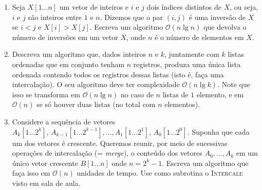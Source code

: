 \documentclass{article}
\begin{document}
\begin{enumerate}[itemsep=3ex, label=\textbf{\arabic*}.]
    \item
    Seja $X[1 \dots n]$ um vetor de inteiros e $i$ e $j$ dois índices distintos de $X$, ou seja,
    $i$ e $j$ são inteiros entre $1$ e $n$. Dizemos que o par $(i, j)$ é uma inversão de $X$
    se $i < j$ e $X[i] > X[j]$. Escreva um algoritmo $\mathcal{O}(n \lg n)$ que devolva o número
    de inversões em um vetor $X$, onde $n$ é o número de elementos em $X$.
    
    \item
    Descreva um algoritmo que, dados inteiros $n$ e $k$, juntamente com $k$ listas ordenadas que
    em conjunto tenham $n$ registros, produza uma única lista ordenada contendo todos os registros
    dessas listas (isto é, faça uma intercalação). O seu algoritmo deve ter complexidade
    $\mathcal{O}(n \lg k)$. Note que isso se transforma em $\mathcal{O}(n \lg n)$ no caso de $n$
    listas de $1$ elemento, e em $\mathcal{O}(n)$ se só houver duas listas (no total com $n$
    elementos).

    \item
    Considere a sequência de vetores $A_k [1 \dots 2^k], \, A_{k - 1} [1 \dots 2^{k - 1}],
    \dots, A_1 [1 \dots 2^1], \, A_0 [1 \dots 2^0]$. Suponha que cada um dos vetores é crescente.
    Queremos reunir, por meio de sucessivas operações de intercalação (= \textit{merge}), o
    conteúdo dos vetores $A_0, \dots , A_k$ em um único vetor crescente $B[1 \dots n]$ onde 
    $n = 2^k - 1$. Escreva um algoritmo que faça isso em $\mathcal{O}(n)$ unidades de tempo. Use 
    como subrotina o \textsc{Intercale} visto em sala de aula.

\end{enumerate}
\end{document}
